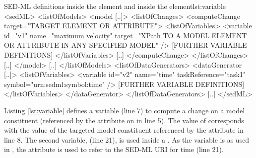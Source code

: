 %

%
\begin{myXmlLst}{SED-ML  definitions inside the  element and inside the  element}{lst:variable}
<sedML>
 <listOfModels>
  <model [..]>
   <listOfChanges>
    <computeChange target="TARGET ELEMENT OR ATTRIBUTE">
     <listOfVariables>
       <variable id="v1" name="maximum velocity" 
        target="XPath TO A MODEL ELEMENT OR ATTRIBUTE IN ANY SPECIFIED MODEL" />
      [FURTHER VARIABLE DEFINITIONS]
     </listOfVariables>
     [..]
    </computeChange>
   </listOfChanges>
   [..]
  </model>
  [..]
 </listOfModels>
 <listOfDataGenerators>
  <dataGenerator [..]>
   <listOfVariables>
    <variable id="v2" name="time" taskReference="task1" symbol="urn:sedml:symbol:time" />
      [FURTHER VARIABLE DEFINITIONS]
   </listOfVariables>
  </dataGenerator>
 </listOfDataGenerators>
 [..]
</sedML>
\end{myXmlLst}
%
Listing \ref{lst:variable} defines a variable  (line 7) to compute a change on a model constituent (referenced by the  attribute on  in line 5). The value of  corresponds with the value of the targeted model constituent referenced by the  attribute in line 8. 
The second variable,  (line 21), is used inside a . As the variable is  as used in , the  attribute is used to refer to the SED-ML URI for time (line 21).






%


